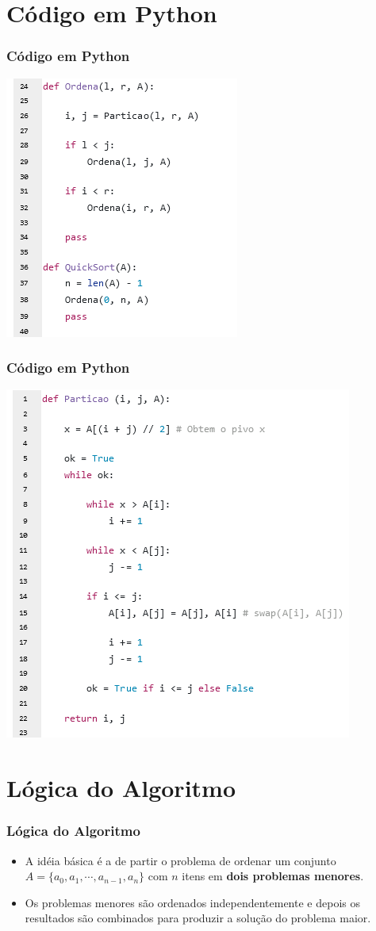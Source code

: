 \documentclass[
	11pt, %
]{beamer}
\begin{document}
\section{Código em Python}
\begin{frame}
	\frametitle{Código em Python}
	\includegraphics[width=0.6\linewidth]{quick_sort_in_python_ordena}
\end{frame}

\begin{frame}
	\frametitle{Código em Python}
	\includegraphics[width=0.7\linewidth]{quick_sort_in_python_particao}
\end{frame}

\section{Lógica do Algoritmo}
\begin{frame}
	\frametitle{Lógica do Algoritmo}
	\justifying
	\begin{itemize}
		\item A idéia básica é a de partir o problema de ordenar um conjunto $A = \{a_0, a_1, \cdots, a_{n-1}, a_{n} \}$ com $n$ itens em \textbf{dois problemas menores}.
		\bigskip
		\item Os problemas menores são ordenados independentemente e depois os resultados são combinados para produzir a solução do problema maior.
	\end{itemize}
\end{frame}
\end{document}
